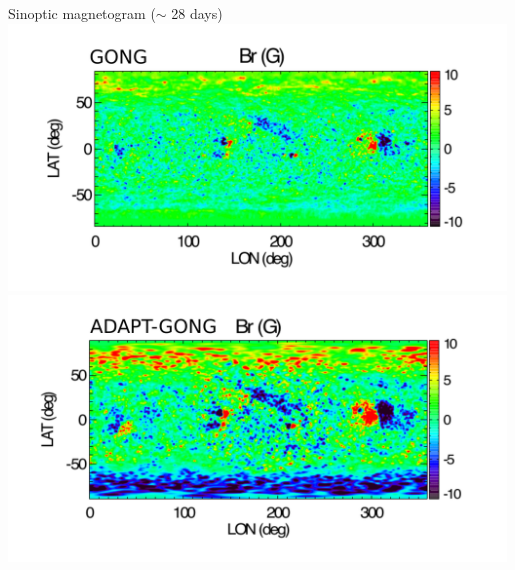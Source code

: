 \documentclass{beamer}
\begin{document}
{{\begin{columns}


\centering 
Sinoptic magnetogram ($\sim$ 28 days)\\
\includegraphics[width=0.99\textwidth]{figuras/fig1_nishtha2019_gong.pdf}\\
\includegraphics[width=0.99\textwidth]{figuras/fig1_nishtha2019_adapt_gong.pdf}


\end{columns}}}
\end{document}
